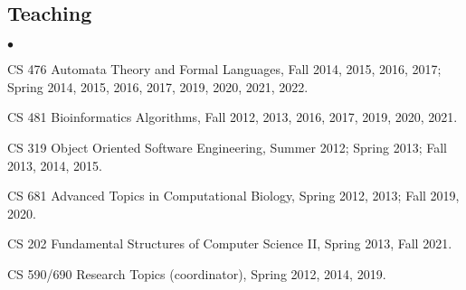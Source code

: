 \documentclass[margin,line]{res}
\newenvironment{list2}{
  \begin{list}{$\bullet$}{%
      \setlength{\itemsep}{0.1cm}
      \setlength{\parsep}{0in} \setlength{\parskip}{0in}
      \setlength{\topsep}{0in} \setlength{\partopsep}{0in} 
      \setlength{\leftmargin}{0.2in}}}{\end{list}}
\begin{document}
\begin{resume}
\vspace{-0.4cm}
\subsection{\small \sc Teaching}
\begin{list2}
  \item CS 476 Automata Theory and Formal Languages, Fall 2014, 2015, 2016, 2017; Spring 2014, 2015, 2016, 2017, 2019, 2020, 2021, 2022. 
  \item CS 481 Bioinformatics Algorithms, Fall 2012, 2013, 2016, 2017, 2019, 2020, 2021.
  \item CS 319 Object Oriented Software Engineering, Summer 2012; Spring 2013; Fall 2013, 2014, 2015.
  \item CS 681 Advanced Topics in Computational Biology, Spring 2012, 2013; Fall 2019, 2020.
  \item CS 202 Fundamental Structures of Computer Science II, Spring 2013, Fall 2021.
  \item CS 590/690 Research Topics (coordinator), Spring 2012, 2014, 2019.
\end{list2}


\vspace{-0.4cm}

\end{resume}
\end{document}
